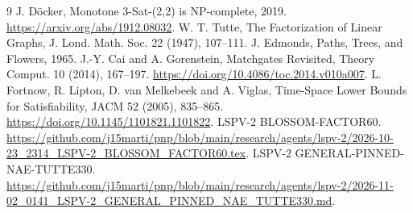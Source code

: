 \documentclass[11pt]{article}
\begin{document}
\begin{thebibliography}{9}
 J. D\"ocker, Monotone 3-Sat-(2,2) is NP-complete, 2019. \url{https://arxiv.org/abs/1912.08032}.
 W. T. Tutte, The Factorization of Linear Graphs, J. Lond. Math. Soc. 22 (1947), 107--111.
 J. Edmonds, Paths, Trees, and Flowers, 1965.
 J.-Y. Cai and A. Gorenstein, Matchgates Revisited, Theory Comput. 10 (2014), 167--197. \url{https://doi.org/10.4086/toc.2014.v010a007}.
 L. Fortnow, R. Lipton, D. van Melkebeek and A. Viglas, Time-Space Lower Bounds for Satisfiability, JACM 52 (2005), 835--865. \url{https://doi.org/10.1145/1101821.1101822}.
 LSPV-2 BLOSSOM-FACTOR60. \url{https://github.com/j15marti/pnp/blob/main/research/agents/lspv-2/2026-10-23_2314_LSPV-2_BLOSSOM_FACTOR60.tex}.
 LSPV-2 GENERAL-PINNED-NAE-TUTTE330. \url{https://github.com/j15marti/pnp/blob/main/research/agents/lspv-2/2026-11-02_0141_LSPV-2_GENERAL_PINNED_NAE_TUTTE330.md}.
\end{thebibliography}
\end{document}
